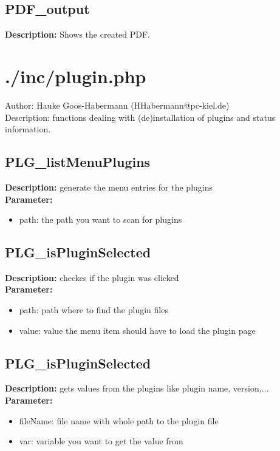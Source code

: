 \subsection{PDF\_output}
\textbf{Description:} Shows the created PDF.\\

\newpage\section{./inc/plugin.php}
 Author: Hauke Goos-Habermann (HHabermann@pc-kiel.de)\\
 Description: functions dealing with (de)installation of plugins and status information.\\

\subsection{PLG\_listMenuPlugins}
\textbf{Description:} generate the menu entries for the plugins\\
\textbf{Parameter:}
\begin{itemize}
\item path: the path you want to scan for plugins
\end{itemize}

\subsection{PLG\_isPluginSelected}
\textbf{Description:} checkes if the plugin was clicked\\
\textbf{Parameter:}
\begin{itemize}
\item path: path where to find the plugin files
\item value: value the menu item should have to load the plugin page
\end{itemize}

\subsection{PLG\_isPluginSelected}
\textbf{Description:} gets values from the plugins like plugin name, version,...\\
\textbf{Parameter:}
\begin{itemize}
\item fileName: file name with whole path to the plugin file
\item var: variable you want to get the value from
\end{itemize}


